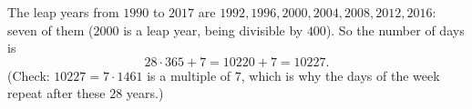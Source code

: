 The leap years from $1990$ to $2017$ are $1992,1996,2000,2004,2008,2012,2016$: seven of them ($2000$ is a leap year, being divisible by $400$). So the number of days is
\[
28\cdot365+7=10220+7=\boxed{10227}.
\]
(Check: $10227=7\cdot1461$ is a multiple of $7$, which is why the days of the week repeat after these $28$ years.)
